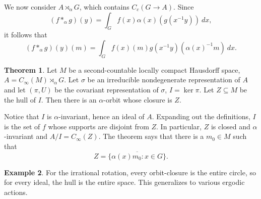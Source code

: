 \documentclass[12pt]{report}
\theoremstyle{definition}
\newtheorem{theorem}{Theorem}[chapter]
\newtheorem{example}[theorem]{Example}
\begin{document}
    We now consider $A \rtimes_\alpha G$, which contains $C_c(G \to A)$. Since
    $$(f *_\alpha g)(y) = \int_G f(x)\alpha(x)(g(x^{-1}y)) ~dx,$$
    it follows that
    $$(f *_\alpha g)(y)(m) = \int_G f(x)(m) g(x^{-1}y)(\alpha(x)^{-1}m) ~dx.$$
\begin{theorem}
    Let $M$ be a second-countable locally compact Hausdorff space, $A = C_\infty(M) \rtimes_\alpha G$. Let $\sigma$ be an irreducible nondegenerate representation of $A$ and let $(\pi, U)$ be the covariant representation of $\sigma$, $I = \ker \pi$. Let $Z \subseteq M$ be the hull of $I$. Then there is an $\alpha$-orbit whose closure is $Z$.
\end{theorem}
    Notice that $I$ is $\alpha$-invariant, hence an ideal of $A$. Expanding out the definitions, $I$ is the set of $f$ whose supports are disjoint from $Z$. In particular, $Z$ is closed and $\alpha$-invariant and $A/I = C_\infty(Z)$. The theorem says that there is a $m_0 \in M$ such that
    $$Z = \overline{\{\alpha(x)m_0: x \in G\}}.$$
\begin{example}
    For the irrational rotation, every orbit-closure is the entire circle, so for every ideal, the hull is the entire space. This generalizes to various ergodic actions.
\end{example}
\end{document}
